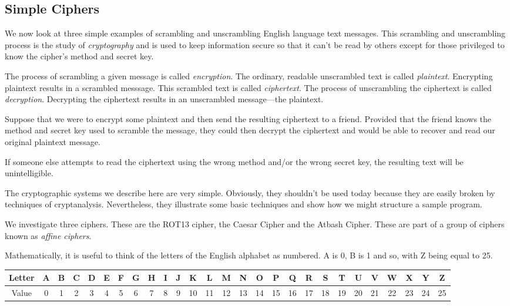 \subsection{Simple Ciphers}

We now look at three simple examples of scrambling and unscrambling English language text messages. This scrambling and unscrambling process is the study of {\it cryptography} and is used to keep information secure so that it can't be read by others except for those privileged to know the cipher's method and secret key.

The process of scrambling a given message is called {\it encryption}. The ordinary, readable unscrambled text is called {\it plaintext}. Encrypting plaintext results in a scrambled messsage. This scrambled text is called {\it ciphertext}. The process of unscrambling the ciphertext is called {\it decryption}. Decrypting the ciphertext results in an unscrambled message---the plaintext.

Suppose that we were to encrypt some plaintext and then send the resulting ciphertext to a friend. Provided that the friend knows the method and secret key used to scramble the message, they could then decrypt the ciphertext and would be able to recover and read our original plaintext message.

If someone else attempts to read the ciphertext using the wrong method and/or the wrong secret key, the resulting text will be unintelligible.

The cryptographic systems we describe here are very simple. Obviously, they shouldn't be used today because they are easily broken by techniques of cryptanalysis. Nevertheless, they illustrate some basic techniques and show how we might structure a sample program.

We investigate three ciphers. These are the ROT13 cipher, the Caesar Cipher and the Atbash Cipher. These are part of a group of ciphers known as {\it affine ciphers}.

Mathematically, it is useful to think of the letters of the English alphabet as numbered. A is 0, B is 1 and so, with Z being equal to 25.

\begin{center}
{\setlength{\tabcolsep}{0.74mm}
\ttfamily

  \begin{tabular}{|c|c|c|c|c|c|c|c|c|c|c|c|c|c|c|c|c|c|c|c|c|c|c|c|c|c|c|}
  \hline
     Letter & A & B & C & D & E & F & G & H & I & J & K & L & M & N & O & P & Q & R & S & T & U & V & W & X & Y & Z \\ \hline
	Value & 0 & 1 & 2 & 3 & 4 & 5 & 6 & 7 & 8 & 9 & 10 & 11 & 12 & 13 & 14 & 15 & 16 & 17 & 18 & 19 & 20 & 21 & 22 & 23 & 24 & 25 \\ \hline
  \end{tabular}
}
\end{center}

